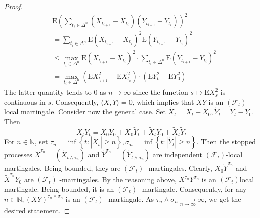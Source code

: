 \begin{itemize}
\begin{proof}
	\[ 
	\begin{aligned}
	&\mathrm{E}\left(\sum_{t_{i} \in \Delta^{n}}\left(X_{t_{i+1}}-X_{t_{i}}\right)\left(Y_{t_{i+1}}-Y_{t_{i}}\right)\right)^{2} \\ &=\sum_{t_{i} \in \Delta^{n}} \mathrm{E}\left(X_{t_{i+1}}-X_{t_{i}}\right)^{2} \mathrm{E}\left(Y_{t_{i+1}}-Y_{t_{i}}\right)^{2} \\
	&\leq \max _{t_{i} \in \Delta^{n}} \mathrm{E}\left(X_{t_{i+1}}-X_{t_{i}}\right)^{2} \cdot \sum_{t_{i} \in \Delta^{n}}  \mathrm{E}\left(Y_{t_{i+1}}-Y_{t_{i}}\right)^{2} \\
	&=\max _{t_{i} \in \Delta^{n}}\left(\mathrm{E} X_{t_{i+1}}^{2}-\mathrm{E} X_{t_{i}}^{2}\right) \cdot\left(\mathrm{E} Y_{t}^{2}-\mathrm{E} Y_{0}^{2}\right)
	\end{aligned}
	 \]
	The latter quantity tends to 0 as $n \rightarrow \infty$ since the function $s \mapsto \mathrm{E} X_{s}^{2}$ is continuous in $s$.  Consequently, $\langle X, Y\rangle= 0$, which implies that $X Y$ is an $\left(\mathcal{F}_{t}\right)$- local martingale.
	Consider now the general case. Set $\widetilde{X}_{t}=X_{t}-X_{0}, \widetilde{Y}_{t}=Y_{t}-Y_{0}$.  Then \[ X_{t} Y_{t}=X_{0} Y_{0}+X_{0} \widetilde{Y}_{t}+\widetilde{X}_{t} Y_{0}+\widetilde{X}_{t} \widetilde{Y}_{t} \]
	For $n \in \mathbb{N}$, set $\tau_{n}=\inf \left\{t:\left|\tilde{X}_{t}\right| \geq n\right\}, \sigma_{n}=\inf \left\{t:\left|\tilde{Y}_{t}\right| \geq n\right\}$.  Then the stopped processes $\tilde{X}^{\tau_{n}}=\left(\tilde{X}_{t \wedge \tau_{n}}\right)$ and $\tilde{Y}^{\sigma_{n}}=\left(\tilde{Y}_{t \wedge \sigma_{n}}\right)$ are independent $\left(\mathcal{F}_{t}\right)$-local martingales. Being bounded, they are $\left(\mathcal{F}_{t}\right)$ -martingales. Clearly, $X_{0} \tilde{Y}^{\sigma_{n}}$
	and $\tilde{X}^{\tau_{n}} Y_{0}$ are $\left(\mathcal{F}_{t}\right)$ -martingales. By the reasoning above, $X^{\tau_{n}} Y^{\sigma_{n}}$ is an $\left(\mathcal{F}_{t}\right)$local martingale. Being bounded, it is an $\left(\mathcal{F}_{t}\right)$ -martingale. Consequently, for any $n \in \mathbb{N},(X Y)^{\tau_{n} \wedge \sigma_{n}}$ is an $\left(\mathcal{F}_{t}\right)$ -martingale. As $\tau_{n} \wedge \sigma_{n} \underset{n \rightarrow \infty}{\longrightarrow} \infty$, we get the desired statement.
	

\end{proof}
\end{itemize}
